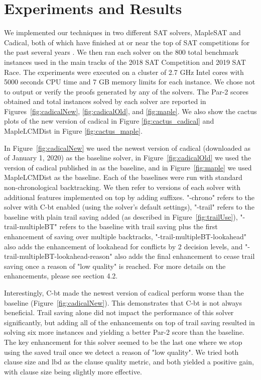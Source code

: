 \documentclass[runningheads]{llncs}
\newcommand{\cbt}{C-bt\xspace}
\begin{document}
\section{Experiments and Results}
We implemented our techniques in two different SAT solvers, MapleSAT
and Cadical, both of which have finished at or near the top of SAT
competitions for the past several years
\cite{Heule2018ProceedingsOS,Heule2019ProceedingsOS}. We then ran each
solver on the 800 total benchmark instances used in the main tracks of
the 2018 SAT Competition and 2019 SAT Race. The experiments were executed on a
cluster of 2.7 GHz Intel cores with 5000 seconds CPU time and 7 GB
memory limits for each instance. We chose not to output or verify the
proofs generated by any of the solvers. The Par-2 scores obtained and
total instances solved by each solver are reported in
Figures~\ref{fig:cadicalNew}, \ref{fig:cadicalOld}, and
\ref{fig:maple}. We also show the cactus plots of the new version of
cadical in Figure \ref{fig:cactus_cadical} and MapleLCMDist in Figure
\ref{fig:cactus_maple}.

In Figure~\ref{fig:cadicalNew} we used the newest version of cadical
(downloaded as of January 1, 2020) as the baseline solver, in
Figure~\ref{fig:cadicalOld} we used the version of cadical published
in \cite{DBLP:conf/sat/MohleB19} as the baseline, and in
Figure~\ref{fig:maple} we used MapleLCMDist \cite{xiao2017maplelrb} as
the baseline. Each of the baselines were run with standard
non-chronological backtracking. We then refer to versions of each
solver with additional features implemented on top by adding
suffixes. "-chrono" refers to the solver with \cbt enabled (using the
solver's default settings), "-trail" refers to the baseline with plain
trail saving added (as described in Figure~\ref{fig:trailUse}),
"-trail-multipleBT" refers to the baseline with trail saving plus the
first enhancement of saving over multiple backtracks,
"-trail-multipleBT-lookahead" also adds the enhancement of lookahead
for conflicts by 2 decision levels, and
"-trail-multipleBT-lookahead-reason" also adds the final enhancement
to cease trail saving once a reason of "low quality" is reached. For
more details on the enhancements, please see section 4.2.

Interestingly, \cbt made the newest version of cadical perform worse
than the baseline (Figure~\ref{fig:cadicalNew}). This demonstrates
that \cbt is not always beneficial. Trail saving alone did not impact
the performance of this solver significantly, but adding all of the
enhancements on top of trail saving resulted in solving six more
instances and yielding a better Par-2 score than the baseline. The key
enhancement for this solver seemed to be the last one where we stop
using the saved trail once we detect a reason of "low quality". We
tried both clause size and lbd as the clause quality metric, and both
yielded a positive gain, with clause size being slightly more
effective.
\end{document}
